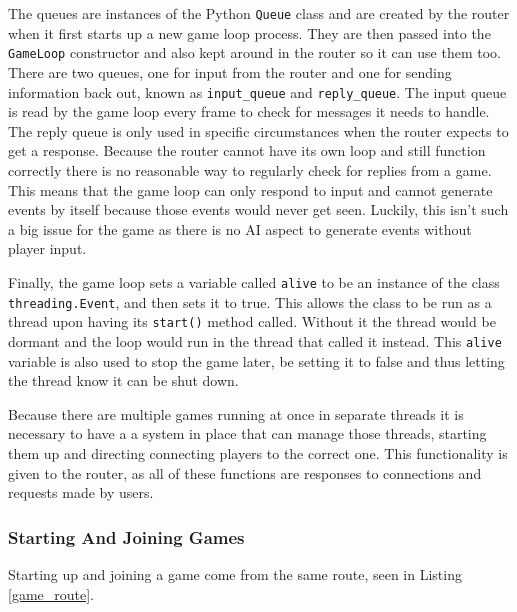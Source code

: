 The queues are instances of the Python \texttt{Queue} class and are created by the router when it first starts up a new game loop process. They are then passed into the \texttt{GameLoop} constructor and also kept around in the router so it can use them too. There are two queues, one for input from the router and one for sending information back out, known as \texttt{input\_queue} and \texttt{reply\_queue}. The input queue is read by the game loop every frame to check for messages it needs to handle. The reply queue is only used in specific circumstances when the router expects to get a response. Because the router cannot have its own loop and still function correctly there is no reasonable way to regularly check for replies from a game. This means that the game loop can only respond to input and cannot generate events by itself because those events would never get seen. Luckily, this isn't such a big issue for the game as there is no AI aspect to generate events without player input.

Finally, the game loop sets a variable called \texttt{alive} to be an instance of the class \texttt{threading.Event}, and then sets it to true. This allows the class to be run as a thread upon having its \texttt{start()} method called. Without it the thread would be dormant and the loop would run in the thread that called it instead. This \texttt{alive} variable is also used to stop the game later, be setting it to false and thus letting the thread know it can be shut down.

Because there are multiple games running at once in separate threads it is necessary to have a a system in place that can manage those threads, starting them up and directing connecting players to the correct one. This functionality is given to the router, as all of these functions are responses to connections and requests made by users.

\subsubsection{Starting And Joining Games}
Starting up and joining a game come from the same route, seen in Listing \ref{game_route}.

